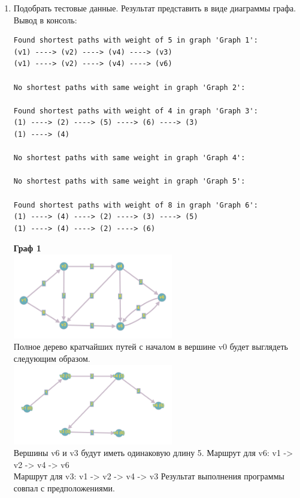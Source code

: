 \documentclass[a4paper,14pt]{extarticle}
\begin{document}
\begin{enumerate}[1.]
\begin{verbatim}
        return true;
    }

    std::cout << "No shortest paths with same weight in graph '" << graphName << "':\n" << std::endl;
    return false;
}
        \end{verbatim}
        \item Подобрать тестовые данные. Результат представить в виде диаграммы графа.\\
        Вывод в консоль:
                    \begin{verbatim}
Found shortest paths with weight of 5 in graph 'Graph 1':
(v1) ----> (v2) ----> (v4) ----> (v3)
(v1) ----> (v2) ----> (v4) ----> (v6)

No shortest paths with same weight in graph 'Graph 2':

Found shortest paths with weight of 4 in graph 'Graph 3':
(1) ----> (2) ----> (5) ----> (6) ----> (3)
(1) ----> (4)

No shortest paths with same weight in graph 'Graph 4':

No shortest paths with same weight in graph 'Graph 5':

Found shortest paths with weight of 8 in graph 'Graph 6':
(1) ----> (4) ----> (2) ----> (3) ----> (5)
(1) ----> (4) ----> (2) ----> (6)
                    \end{verbatim}
        
        \textbf{Граф 1}\\
        \includegraphics[width=70mm]{testTree1Before}\\
        Полное дерево кратчайших путей с началом в вершине v0 будет выглядеть следующим образом.\\
        \includegraphics[width=70mm]{testTree1After}\\
        Вершины v6 и v3 будут иметь одинаковую длину 5.\bigbreak
        Маршрут для v6: v1 -> v2 -> v4 -> v6\\
        Маршрут для v3: v1 -> v2 -> v4 -> v3\bigbreak
        Результат выполнения программы совпал с предположениями.\\


\end{enumerate}
\end{document}
